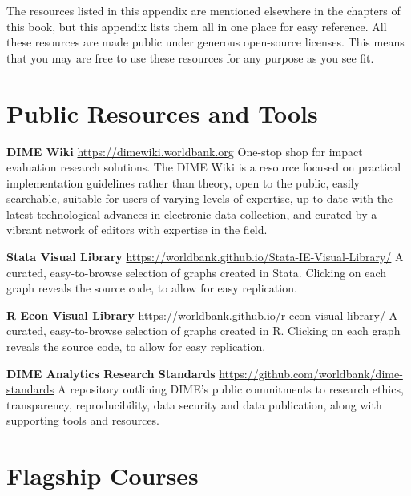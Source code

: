 
\begin{fullwidth}

The resources listed in this appendix are mentioned elsewhere in
the chapters of this book, but this appendix lists them all in one place for easy reference. All
these resources are made public under generous open-source licenses. This means
that you may are free to use these resources for any purpose as you see fit.

\end{fullwidth}


\section{Public Resources and Tools}

\textbf{DIME Wiki}
\url{https://dimewiki.worldbank.org}
One-stop shop for impact evaluation research solutions. The DIME Wiki is a resource focused on practical implementation guidelines rather than theory, open to the public, easily searchable, suitable for users of varying levels of expertise, up-to-date with the latest technological advances in electronic data collection, and curated by a vibrant network of editors with expertise in the field.

\textbf{Stata Visual Library}
\url{https://worldbank.github.io/Stata-IE-Visual-Library/}
A curated, easy-to-browse selection of graphs created in Stata. Clicking on each graph reveals the source code, to allow for easy replication. 

\textbf{R Econ Visual Library}
\url{https://worldbank.github.io/r-econ-visual-library/}
A curated, easy-to-browse selection of graphs created in R. Clicking on each graph reveals the source code, to allow for easy replication. 

\textbf{DIME Analytics Research Standards}
\url{https://github.com/worldbank/dime-standards}
A repository outlining DIME's public commitments to research ethics, transparency, reproducibility, data security and data publication, along with supporting tools and resources. 


\section{Flagship Courses}


